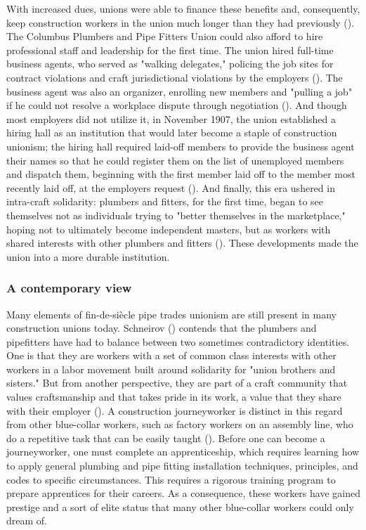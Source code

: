 \documentclass[12pt]{article}
\begin{document}
With increased dues, unions were able to finance these benefits and, consequently, keep construction workers in the union much longer than they had previously (\cite[59]{schneirovPrideSolidarityHistory1993}). The Columbus Plumbers and Pipe Fitters Union could also afford to hire professional staff and leadership for the first time. The union hired full-time business agents, who served as "walking delegates," policing the job sites for contract violations and craft jurisdictional violations by the employers (\citeyear[60]{schneirovPrideSolidarityHistory1993}). The business agent was also an organizer, enrolling new members and "pulling a job" if he could not resolve a workplace dispute through negotiation (\citeyear[60]{schneirovPrideSolidarityHistory1993}). And though most employers did not utilize it, in November 1907, the union established a hiring hall as an institution that would later become a staple of construction unionism; the hiring hall required laid-off members to provide the business agent their names so that he could register them on the list of unemployed members and dispatch them, beginning with the first member laid off to the member most recently laid off, at the employers request (\citeyear[60–61]{schneirovPrideSolidarityHistory1993}). And finally, this era ushered in intra-craft solidarity: plumbers and fitters, for the first time, began to see themselves not as individuals trying to "better themselves in the marketplace," hoping not to ultimately become independent masters, but as workers with shared interests with other plumbers and fitters (\citeyear[61]{schneirovPrideSolidarityHistory1993}). These developments made the union into a more durable institution.

\subsubsection{A contemporary view}

Many elements of fin-de-si\`{e}cle pipe trades unionism are still present in many construction unions today. Schneirov (\citeyear{schneirovPrideSolidarityHistory1993}) contends that the plumbers and pipefitters have had to balance between two sometimes contradictory identities. One is that they are workers with a set of common class interests with other workers in a labor movement built around solidarity for "union brothers and sisters." But from another perspective, they are part of a craft community that values craftsmanship and that takes pride in its work, a value that they share with their employer (\cite[3--4]{schneirovPrideSolidarityHistory1993}). A construction journeyworker is distinct in this regard from other blue-collar workers, such as factory workers on an assembly line, who do a repetitive task that can be easily taught (\cite[5]{schneirovPrideSolidarityHistory1993}). Before one can become a journeyworker, one must complete an apprenticeship, which requires learning how to apply general plumbing and pipe fitting installation techniques, principles, and codes to specific circumstances. This requires a rigorous training program to prepare apprentices for their careers. As a consequence, these workers have gained prestige and a sort of elite status that many other blue-collar workers could only dream of.
\end{document}
